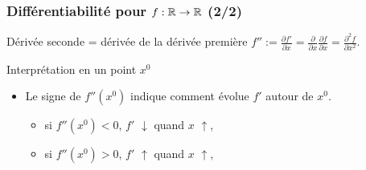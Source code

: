 \begin{frame}
  \frametitle{Différentiabilité pour $f: {\mathbb{R}} \rightarrow {\ensuremath\mathbb{R}}$ (2/2) }

  \begin{block}{Dérivée seconde = dérivée de la dérivée première}
    $f'' := \frac{\partial f'}{\partial x} = \frac{\partial}{\partial x}\frac{\partial f}{\partial x}
    = \frac{\partial ^{2}f}{\partial x^{2}}$.
  \end{block}

  \begin{block}{Interprétation en un point $x^0$}
    \begin{itemize}
    \item Le signe de $f''(x^0)$ indique comment évolue $f'$ autour de $x^0$. 
      \begin{itemize}
      \item si $f''(x^0) < 0$, $f'$ $\downarrow$ quand $x$ $\uparrow$, \dome
      \item si $f''(x^0) > 0$, $f'$ $\uparrow$ quand $x$ $\uparrow$,   \bol
      \end{itemize}
    \end{itemize}
  \end{block}

  
\end{frame}


